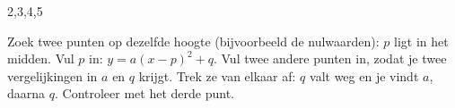 \begin{alleenvoor}{2,3,4,5}
\begin{werkwijze}
Zoek twee punten op dezelfde hoogte (bijvoorbeeld de nulwaarden): $p$ ligt in het midden. Vul $p$ in: $y = a(x - p)^2 + q$. Vul twee andere punten in, zodat je twee vergelijkingen in $a$ en $q$ krijgt. Trek ze van elkaar af: $q$ valt weg en je vindt $a$, daarna $q$. Controleer met het derde punt.
\end{werkwijze}

\begin{oefeningen}
\end{oefeningen}
\end{alleenvoor}

\opdrachtenkop

\begin{oefeningen}























\end{oefeningen}
